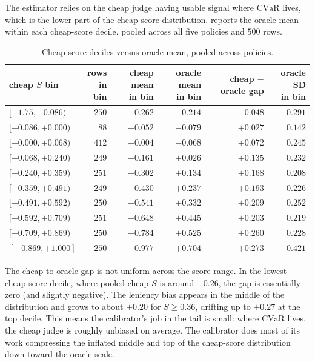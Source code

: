 \documentclass[11pt]{article}
\newcommand{\CVaR}{\mathrm{CVaR}}
\begin{document}
The estimator relies on the cheap judge having usable signal where
$\CVaR$ lives, which is the lower part of the cheap-score
distribution.  reports the oracle mean within
each cheap-score decile, pooled across all five policies and $500$
rows.

\begin{table}[h]
\centering\small
\caption{Cheap-score deciles versus oracle mean, pooled across
policies.}
\label{tab:reliability}
\begin{tabular}{l r r r r r}
\toprule
\thead{cheap $S$\\ bin} & \thead{rows\\ in bin} & \thead{cheap mean\\ in bin} & \thead{oracle mean\\ in bin} & \thead{cheap $-$\\ oracle gap} & \thead{oracle SD\\ in bin} \\
\midrule
$[-1.75, -0.086)$  & $250$ & $-0.262$ & $-0.214$ & $-0.048$ & $0.291$ \\
$[-0.086, +0.000)$ & $ 88$ & $-0.052$ & $-0.079$ & $+0.027$ & $0.142$ \\
$[+0.000, +0.068)$ & $412$ & $+0.004$ & $-0.068$ & $+0.072$ & $0.245$ \\
$[+0.068, +0.240)$ & $249$ & $+0.161$ & $+0.026$ & $+0.135$ & $0.232$ \\
$[+0.240, +0.359)$ & $251$ & $+0.302$ & $+0.134$ & $+0.168$ & $0.208$ \\
$[+0.359, +0.491)$ & $249$ & $+0.430$ & $+0.237$ & $+0.193$ & $0.226$ \\
$[+0.491, +0.592)$ & $250$ & $+0.541$ & $+0.332$ & $+0.209$ & $0.252$ \\
$[+0.592, +0.709)$ & $251$ & $+0.648$ & $+0.445$ & $+0.203$ & $0.219$ \\
$[+0.709, +0.869)$ & $250$ & $+0.784$ & $+0.525$ & $+0.260$ & $0.228$ \\
$[+0.869, +1.000]$ & $250$ & $+0.977$ & $+0.704$ & $+0.273$ & $0.421$ \\
\bottomrule
\end{tabular}
\end{table}

The cheap-to-oracle gap is not uniform across the score range. In the
lowest cheap-score decile, where pooled cheap $S$ is around $-0.26$,
the gap is essentially zero (and slightly negative). The leniency bias
appears in the middle of the distribution and grows to about $+0.20$
for $S \ge 0.36$, drifting up to $+0.27$ at the top decile. This means
the calibrator's job in the tail is small: where $\CVaR$ lives, the
cheap judge is roughly unbiased on average. The calibrator does most
of its work compressing the inflated middle and top of the
cheap-score distribution down toward the oracle scale.
\end{document}
